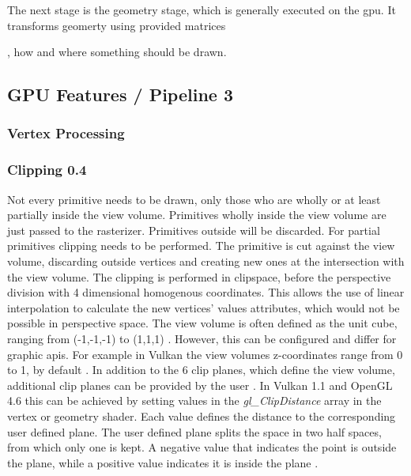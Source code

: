 The next stage is the geometry stage, which is generally executed on the \gls{gpu}. It transforms geomerty using provided matrices

 


, how and where something should be drawn.

\cite{akine:2018:realtime}

\subsection{GPU Features / Pipeline 3}

\subsubsection{Vertex Processing}

\subsubsection{Clipping 0.4}
\label{section:clipping}

Not every primitive needs to be drawn, only those who are wholly or at least partially inside the view volume. Primitives wholly inside the view volume are just passed to the rasterizer. Primitives outside will be discarded. For partial primitives clipping needs to be performed. The primitive is cut against the view volume, discarding outside vertices and creating new ones at the intersection with the view volume.  The clipping is performed in clipspace, before the perspective division with 4 dimensional homogenous coordinates. This allows the use of linear interpolation to calculate the new vertices' values attributes, which would not be possible in perspective space. The view volume is often defined as the unit cube, ranging from (-1,-1,-1) to (1,1,1) \cite{akine:2018:realtime}. However, this can be configured and differ for graphic \glspl{api}. For example in Vulkan the view volumes z-coordinates range from 0 to 1, by default \cite{khronos:glsl4.60:spec}. In addition to the 6 clip planes, which define the view volume, additional clip planes can be provided by the user \cite{akine:2018:realtime}. In Vulkan 1.1 and OpenGL 4.6 this can be achieved by setting values in the \textit{gl\_ClipDistance} array in the vertex or geometry shader. Each value defines the distance to the corresponding user defined plane. The user defined plane splits the space in two half spaces, from which only one is kept. A negative value that indicates the point is outside the plane, while a positive value indicates it is inside the plane \cite{khronos:vulkan:spec1.1, khronos:openGL:spec4.6}.

